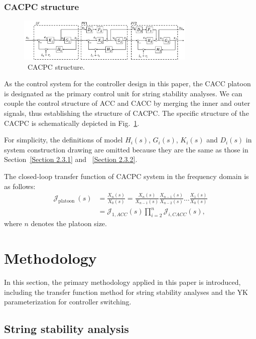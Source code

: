 \documentclass[journal]{IEEEtran}
\begin{document}
\subsubsection{CACPC structure}
\label{Section 2.3.3}

\begin{figure}
  \centering
  \includegraphics[width=8.5cm]{figs/fig3.png}
  \caption{~CACPC structure.}
  \label{fig3}
\end{figure}

As the control system for the controller design in this paper, the CACC platoon is designated as the primary control unit for string stability analyses. We can couple the control structure of ACC and CACC by merging the inner and outer signals, thus establishing the structure of CACPC. The specific structure of the CACPC is schematically depicted in Fig.~\ref{fig3}.

For simplicity, the definitions of model $H_i(s)$, $G_i(s)$, $K_i(s)$ and $D_i(s)$ in system construction drawing are omitted because they are the same as those in Section~\ref{Section 2.3.1} and ~\ref{Section 2.3.2}.

The closed-loop transfer function of CACPC system in the frequency domain is as follows:
\begin{equation}
  \begin{aligned}
    \mathcal{J}_{\text {platoon }}(s)
     & =\frac{X_{n}(s)}{X_{0}(s)}=\frac{X_{n}(s)}{X_{n-1}(s)} \frac{X_{n-1}(s)}{X_{n-2}(s)} \ldots \frac{X_{1}(s)}{X_{0}(s)} \\
     & =\mathcal{J}_{1, A C C}(s) \prod_{i=2}^{n} \mathcal{J}_{i, C A C C}(s),
  \end{aligned}
  \label{Eq8}
\end{equation}
where $n$ denotes the platoon size.

\section{Methodology}
\label{Section 3}
In this section, the primary methodology applied in this paper is introduced, including the transfer function method for string stability analyses and the YK parameterization for controller switching.

\subsection{String stability analysis}
\label{Section 3.1}
\end{document}
